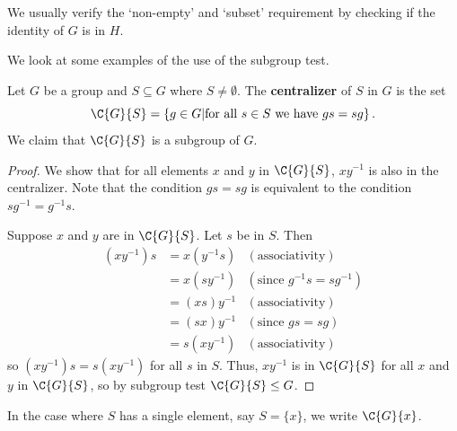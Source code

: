 \begin{remark}
We usually verify the `non-empty' and `subset' requirement by checking if the identity of $G$ is in $H$.
\end{remark}

\newpage

We look at some examples of the use of the subgroup test.
\begin{example}\label{example-centralizer-of-a-subset}
    Let $G$ be a group and $S \subseteq G$ where $S \neq \emptyset$. The \textbf{centralizer} of $S$ in $G$ is the set
    \[
        \C{G}{S} = \left\{g \in G \vert \text{for all } s \in S \text{ we have } gs = sg\right\}.
    \]
    We claim that $\C{G}{S}$ is a subgroup of $G$.
    \begin{proof}
        We show that for all elements $x$ and $y$ in $\C{G}{S}$, $xy^{-1}$ is also in the centralizer. Note that the condition $gs = sg$ is equivalent to the condition $sg^{-1} = g^{-1}s$.

        Suppose $x$ and $y$ are in $\C{G}{S}$. Let $s$ be in $S$. Then
        \begin{align*}
            (xy^{-1})s &= x(y^{-1}s) & (\text{associativity})\\
            &= x(sy^{-1}) & (\text{since } g^{-1}s = sg^{-1})\\
            &= (xs)y^{-1} & (\text{associativity})\\
            &= (sx)y^{-1} & (\text{since } gs = sg)\\
            &= s(xy^{-1}) & (\text{associativity})
        \end{align*}
        so $(xy^{-1})s = s(xy^{-1})$ for all $s$ in $S$. Thus, $xy^{-1}$ is in $\C{G}{S}$ for all $x$ and $y$ in $\C{G}{S}$, so by subgroup test $\C{G}{S} \leq G$.
    \end{proof}
\end{example}
\begin{remark}
    In the case where $S$ has a single element, say $S = \{x\}$, we write $\C{G}{x}$.
\end{remark}

